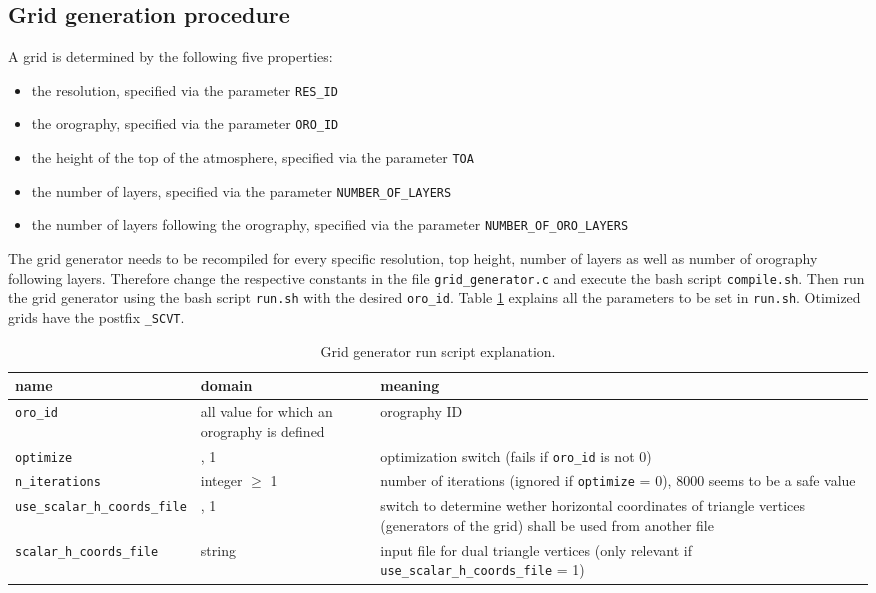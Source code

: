 \documentclass[10pt]{report}
\begin{document}
\subsection{Grid generation procedure}
\label{sec:grid_generation_procedure}

A grid is determined by the following five properties:

\begin{itemize}
\item the resolution, specified via the parameter \texttt{RES\_ID}
\item the orography, specified via the parameter \texttt{ORO\_ID}
\item the height of the top of the atmosphere, specified via the parameter \texttt{TOA}
\item the number of layers, specified via the parameter \texttt{NUMBER\_OF\_LAYERS}
\item the number of layers following the orography, specified via the parameter \texttt{NUMBER\_OF\_ORO\_LAYERS}
\end{itemize}
%
The grid generator needs to be recompiled for every specific resolution, top height, number of layers as well as number of orography following layers. Therefore change the respective constants in the file \texttt{grid\_generator.c} and execute the bash script \texttt{compile.sh}. Then run the grid generator using the bash script \texttt{run.sh} with the desired \texttt{oro\_id}. Table \ref{tab:grid_generator_run_file_explanation} explains all the parameters to be set in \texttt{run.sh}. Otimized grids have the postfix \texttt{\_SCVT}.

\renewcommand{\arraystretch}{1.2}
\begin{table}
\centering
\begin{tabular}{|>{\centering}p{5.0 cm}|>{\centering}p{3 cm}|>{\centering}p{7 cm}|}
\hline \textbf{name} & \textbf{domain} & \textbf{meaning} \tabularnewline
\hline\hline \texttt{oro\_id} & all value for which an orography is defined & orography ID \tabularnewline
\hline\hline \texttt{optimize} & 0, 1 & optimization switch (fails if \texttt{oro\_id} is not 0) \tabularnewline
\hline\hline \texttt{n\_iterations} & integer $\geq$ 1 & number of iterations (ignored if \texttt{optimize} = 0), 8000 seems to be a safe value \tabularnewline
\hline\hline \texttt{use\_scalar\_h\_coords\_file} & 0, 1 & switch to determine wether horizontal coordinates of triangle vertices (generators of the grid) shall be used from another file \tabularnewline
\hline\hline \texttt{scalar\_h\_coords\_file} & string & input file for dual triangle vertices (only relevant if \texttt{use\_scalar\_h\_coords\_file} = 1) \tabularnewline
\hline
\end{tabular}
\caption{Grid generator run script explanation.}
\label{tab:grid_generator_run_file_explanation}
\end{table}
\renewcommand{\arraystretch}{1}
\end{document}
